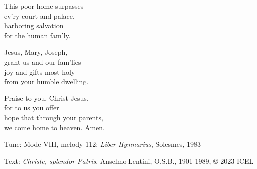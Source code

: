 \hymn



\begin{underhymnverse}
This poor home surpasses\\
ev’ry court and palace,\\
harboring salvation\\
for the human fam’ly.

Jesus, Mary, Joseph,\\
grant us and our fam’lies\\
joy and gifts most holy\\
from your humble dwelling.

Praise to you, Christ Jesus,\\
for to us you offer\\
hope that through your parents,\\
we come home to heaven. Amen.
\end{underhymnverse}

\begin{hymnsource}
Tune: Mode VIII, melody 112; \emph{Liber Hymnarius}, Solesmes, 1983

Text: \emph{Christe, splendor Patris}, Anselmo Lentini, O.S.B., 1901-1989, © 2023 ICEL
\end{hymnsource}
